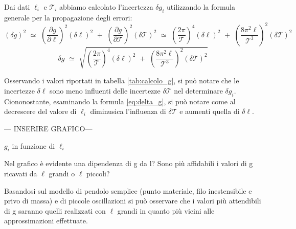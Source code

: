 Dai dati $\ell_i$ e $\mathcal{T}_i$ abbiamo calcolato l'incertezza $\delta g_i$ utilizzando la formula generale per la propagazione degli errori:
\begin{equation*}
	(\delta g)^2 \,\, \simeq \,\, \left( \frac{\partial g}{\partial \ell} \right)^2 (\delta \ell)^2 \,\, + \,\, \left( \frac{\partial g}{\partial \mathcal{T}} \right)^2 (\delta \mathcal{T})^2 \,\, \simeq \,\, \left( \frac{2 \pi}{\mathcal{T}} \right)^4 (\delta \ell)^2 \,\, + \,\, \left( \frac{8 \pi^2 \ell}{\mathcal{T}^3} \right)^2 (\delta \mathcal{T})^2
\end{equation*}
\begin{equation} \label{eq:delta_g}
	\delta g \,\, \simeq \,\, \sqrt{\left( \frac{2 \pi}{\mathcal{T}} \right)^4 (\delta \ell)^2 \,\, + \,\, \left( \frac{8 \pi^2 \ell}{\mathcal{T}^3} \right)^2 (\delta \mathcal{T})^2}
\end{equation}

Osservando i valori riportati in tabella \ref{tab:calcolo_g}, si può notare che le incertezze $\delta\ell$ sono meno influenti delle incertezze $\delta\mathcal{T}$ nel determinare $\delta g_i$. Ciononostante, esaminando la formula \ref{eq:delta_g}, si può notare come al decrescere del valore di $\ell_i$ diminusica l'influenza di $\delta\mathcal{T}$ e aumenti quella di $\delta\ell$.

\begin{center}
--- INSERIRE GRAFICO---

$g_i$ in funzione di $\ell_i$ 
\end{center}

Nel grafico è evidente una dipendenza di g da l? Sono più affidabili i valori di g ricavati da $\ell$ grandi o $\ell$ piccoli?

Basandosi sul modello di pendolo semplice (punto materiale, filo inestensibile e privo di massa) e di piccole oscillazioni si può osservare che i valori più attendibili di g saranno quelli realizzati con $\ell$ grandi in quanto più vicini alle approssimazioni effettuate.